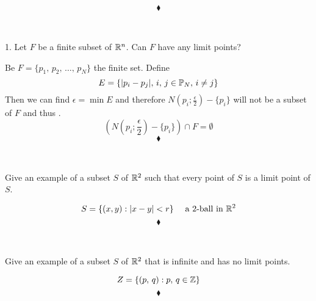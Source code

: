 $$\blacklozenge$$\\


\newpage


\renewcommand{\thesubsection}{\thesection.\arabic{subsection}}
\setcounter{subsection}{0}

\subsection{}
\begin{tcolorbox}
1. Let $F$ be a finite subset of $\mathbb{R}^n$. Can $F$ have any limit points?
\end{tcolorbox}
Be $F=\{p_1,\, p_2,\, \dots ,\, p_N\}$ the finite set. Define 
$$E=\{|p_i-p_j|,\, i,\, j\in \mathbb{P}_N,\, i\neq j\}$$
Then we can find $\epsilon=\min E$ and therefore $N(p_i;\frac{\epsilon}{2})-\{p_i\}$ will not be a subset of $F$ and thus . \\
$$\left(N(p_i;\frac{\epsilon}{2})-\{p_i\}\right)\cap F=\emptyset$$
$$\blacklozenge$$\\


\subsection{}
\begin{tcolorbox}
Give an example of a subset $S$ of $\mathbb{R}^2$ such that every point of $S$ is a limit point of $S$.
\end{tcolorbox}
$$S=\{(x,y): |x-y|<r\}\quad \text{ a }2\text{-ball in } \mathbb{R}^2$$
$$\blacklozenge$$\\


\subsection{}
\begin{tcolorbox}
Give an example of a subset $S$ of $\mathbb{R}^2$ that is infinite and has no limit points.
\end{tcolorbox}
$$Z=\{(p,\, q):p,\, q\in \mathbb{Z}\}$$
$$\blacklozenge$$\\


